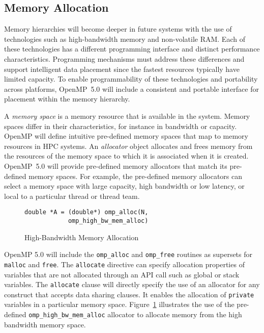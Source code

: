 \subsection{Memory Allocation}
\label{sub:allocators_and_hierarchical_memory}

Memory hierarchies will become deeper in future systems with the use of 
technologies such as high-bandwidth memory and non-volatile RAM. Each 
of these technologies has a different programming interface and distinct
performance characteristics. Programming mechanisms must address these 
differences and support intelligent data placement since the fastest resources
typically have limited capacity. To enable programmability of these 
technologies and portability across platforms, OpenMP~5.0 will include a 
consistent and portable interface for placement within the memory hierarchy.

A \emph{memory space} is a memory resource that is available in the system.
Memory spaces differ in their characteristics, for instance in bandwidth or 
capacity. OpenMP will define intuitive pre-defined memory spaces that map to 
memory resources in HPC systems. An \emph{allocator} object allocates and 
frees memory from the resources of the memory space to which it is associated 
when it is created. OpenMP~5.0 will provide pre-defined memory allocators that
match its pre-defined memory spaces. For example, the pre-defined memory 
allocators can select a memory space with large capacity, high bandwidth or 
low latency, or local to a particular thread or thread team.

\begin{figure}
\begin{verbatim}
double *A = (double*) omp_alloc(N,
            omp_high_bw_mem_alloc)
\end{verbatim}
\caption{High-Bandwidth Memory Allocation\label{fig:allocators}}
\end{figure}

OpenMP 5.0 will include the \texttt{omp\_alloc} and \texttt{omp\_free} 
routines as supersets for \texttt{malloc} and \texttt{free}. The 
\texttt{allocate} directive can specify allocation properties of variables 
that are not allocated through an API call such as global or stack variables. 
The \texttt{allocate} clause will directly specify the use of an allocator 
for any construct that accepts data sharing clauses. It enables the allocation
of \texttt{private} variables in a particular memory space. 
Figure~\ref{fig:allocators} illustrates the use of the pre-defined 
\texttt{omp\_high\_bw\_mem\_alloc} allocator to allocate memory from the 
high bandwidth memory space.

